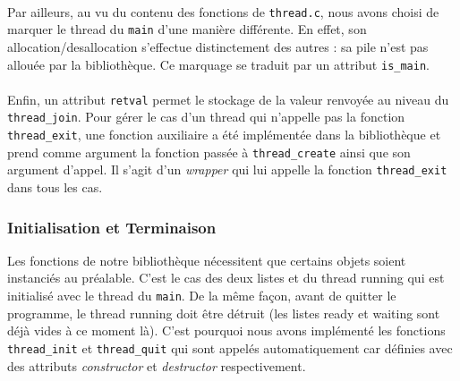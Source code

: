 \paragraph{}
Par ailleurs, au vu du contenu des fonctions de \texttt{thread.c}, nous avons choisi de marquer le thread du \texttt{main} d'une manière différente. En effet, son allocation/desallocation s'effectue distinctement des autres : sa pile n'est pas allouée par la bibliothèque. Ce marquage se traduit par un attribut \texttt{is\_main}. 
\paragraph{}
Enfin, un attribut \texttt{retval} permet le stockage de la valeur renvoyée au niveau du \texttt{thread\_join}. Pour gérer le cas d'un thread qui n'appelle pas la fonction \texttt{thread\_exit}, une fonction auxiliaire a été implémentée dans la bibliothèque et prend comme argument la fonction passée à \texttt{thread\_create} ainsi que son argument d'appel. Il s'agit d'un \emph{wrapper} qui lui appelle la fonction \texttt{thread\_exit} dans tous les cas.

\subsubsection{Initialisation et Terminaison}
Les fonctions de notre bibliothèque nécessitent que certains objets soient instanciés au préalable. C'est le cas des deux listes et du thread running qui est initialisé avec le thread du \texttt{main}. De la même façon, avant de quitter le programme, le thread running doit être détruit (les listes ready et waiting sont déjà vides à ce moment là). C'est pourquoi nous avons implémenté les fonctions \texttt{thread\_init} et \texttt{thread\_quit} qui sont appelés automatiquement car définies avec des attributs \emph{constructor} et \emph{destructor} respectivement.

